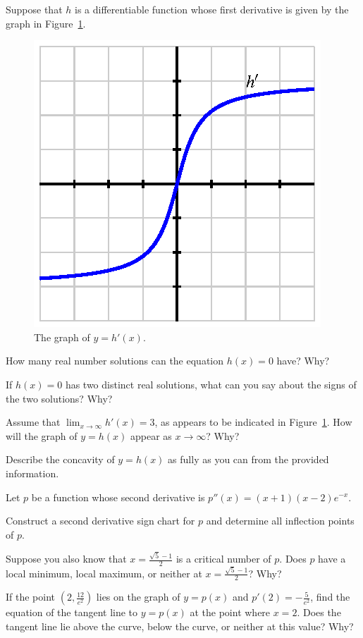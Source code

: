 \begin{exercises}
\item Suppose that $h$ is a differentiable function whose first derivative is given by the graph in Figure~\ref{F:3.1.Ez3}.
\begin{figure}[h]
\begin{center}
\includegraphics{figures/3_1_Ez3.eps}
\end{center}
\caption{The graph of $y = h'(x)$.} \label{F:3.1.Ez3}
\end{figure}
\ba
	\item How many real number solutions can the equation $h(x) = 0$ have?  Why?
	\item If $h(x) = 0$ has two distinct real solutions, what can you say about the signs of the two solutions?  Why?
	\item Assume that $\lim_{x \to \infty} h'(x) = 3$, as appears to be indicated in Figure~\ref{F:3.1.Ez3}.  How will the graph of $y = h(x)$ appear as $x \to \infty$?  Why?
	\item Describe the concavity of $y = h(x)$ as fully as you can from the provided information.
\ea

\item Let $p$ be a function whose second derivative is $p''(x) = (x+1)(x-2)e^{-x}$.
	\ba
		\item Construct a second derivative sign chart for $p$ and determine all inflection points of $p$.
		\item Suppose you also know that $x = \frac{\sqrt{5}-1}{2}$ is a critical number of $p$.  Does $p$ have a local minimum, local maximum, or neither at $x = \frac{\sqrt{5}-1}{2}$?  Why?
		\item If the point $(2, \frac{12}{e^2})$ lies on the graph of $y = p(x)$ and $p'(2) = -\frac{5}{e^2}$, find the equation of the tangent line to $y = p(x)$ at the point where $x = 2$.  Does the tangent line lie above the curve, below the curve, or neither at this value?  Why?
	\ea
\end{exercises}
\afterexercises